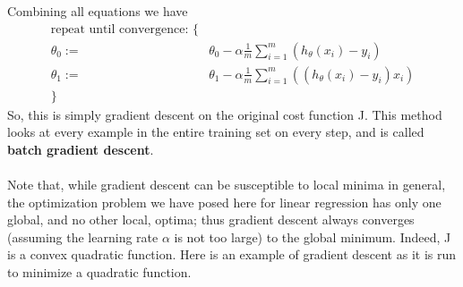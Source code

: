 \documentclass[a4paper, 10pt]{article}
\begin{document}
Combining all equations we have
\begin{equation}
\begin{aligned} 
	\text{repeat until convergence: } \lbrace & \\
	\theta_0 := & \theta_0 - \alpha \frac{1}{m} \sum\limits_{i=1}^{m}(h_\theta(x_{i}) - y_{i}) \\
	\theta_1 := & \theta_1 - \alpha \frac{1}{m} \sum\limits_{i=1}^{m}\left((h_\theta(x_{i}) - y_{i}) x_{i}\right) \\
	\rbrace& 
\end{aligned}
\end{equation}
So, this is simply gradient descent on the original cost function J. This method looks at every example in the entire training set on every step, and is called \textbf{batch gradient descent}. \\
\\
Note that, while gradient descent can be susceptible to local minima in general, the optimization problem we have posed here for linear regression has only one global, and no other local, optima; thus gradient descent always converges (assuming the learning rate $\alpha$ is not too large) to the global minimum. Indeed, J is a convex quadratic function. Here is an example of gradient descent as it is run to minimize a quadratic function.
\end{document}

